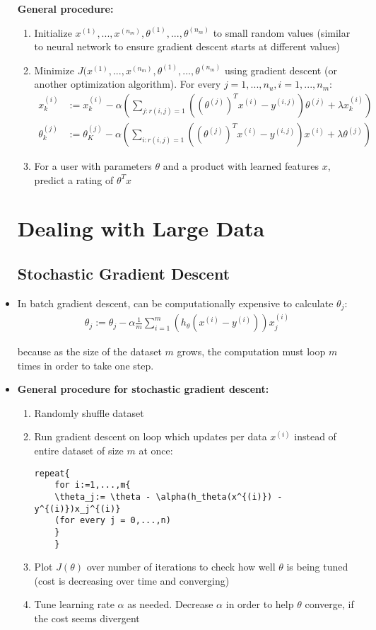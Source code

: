 \documentclass[titlepage]{article}
\begin{document}
\begin{itemize}
\textbf{General procedure:}
\begin{enumerate}
	\item Initialize $x^{(1)},...,x^{(n_m)}, \theta^{(1)},...,\theta^{(n_m)}$ to small random values (similar to neural network to ensure gradient descent starts at different values)
	\item Minimize $J(x^{(1)},...,x^{(n_m)}, \theta^{(1)},...,\theta^{(n_m)}$ using gradient descent (or another optimization algorithm). For every $j=1,...,n_u, i=1,...,n_m$:
	\begin{align*}
		x_k^{(i)} &:= x_k^{(i)} - \alpha \left( \sum_{j:r(i,j)=1} ((\theta^{(j)})^T x^{(i)} - y^{(i,j)}) \theta^{(j)} + \lambda x_k^{(i)}\right)\\
		\theta_k^{(j)} &:= \theta_K^{(j)} - \alpha \left( \sum_{i:r(i,j)=1} ((\theta^{(j)})^T x^{(i)} - y^{(i,j)})x^{(i)} + \lambda \theta^{(j)}\right)
	\end{align*}
	\item For a user with parameters $\theta$ and a product with learned features $x$, predict a rating of $\theta^Tx$
\end{enumerate}

\section{Dealing with Large Data}
\subsection{Stochastic Gradient Descent}

\item In batch gradient descent, can be computationally expensive to calculate $\theta_j$:
\begin{align*}
	\theta_j := \theta_j - \alpha \frac{1}{m} \sum_{i=1}^{m} (h_\theta (x^{(i)} - y^{(i)}))x_j^{(i)}
\end{align*}

because as the size of the dataset $m$ grows, the computation must loop $m$ times in order to take one step.

\item \textbf{General procedure for stochastic gradient descent:}
\begin{enumerate}
	\item Randomly shuffle dataset
	\item Run gradient descent on loop which updates per data $x^{(i)}$ instead of entire dataset of size $m$ at once:
	\begin{Verbatim}[obeytabs]
	repeat{
	for i:=1,...,m{
	\theta_j:= \theta - \alpha(h_theta(x^{(i)}) - y^{(i)})x_j^{(i)}
	(for every j = 0,...,n)
	}
	}
	\end{Verbatim}
	\item Plot $J(\theta)$ over number of iterations to check how well $\theta$ is being tuned (cost is decreasing over time and converging)
	\item Tune learning rate $\alpha$ as needed. Decrease $\alpha$ in order to help $\theta$ converge, if the cost seems divergent
	\end{enumerate}
	

\end{itemize}
\end{document}
